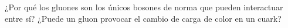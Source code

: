 \documentclass[./../main.tex]{subfiles}
\begin{document}
	\begin{exercise}
		¿Por qué los gluones son los únicos bosones de norma que pueden interactuar entre sí? ¿Puede un gluon provocar el cambio de carga de color en un cuark?
	\end{exercise}
\end{document}

